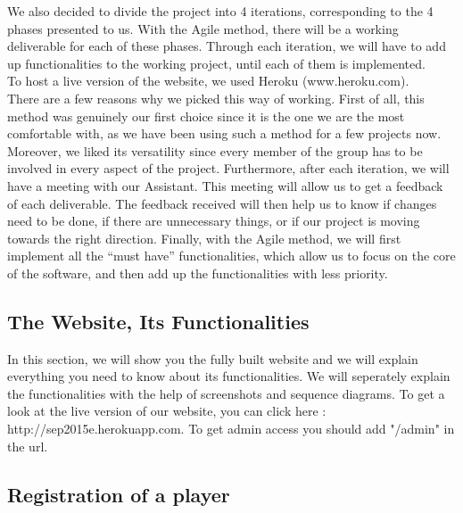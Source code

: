 \documentclass[a4paper, 12pt]{article}
\begin{document}
We also decided to divide the project into 4 iterations, corresponding to the 4 phases presented to us. With the Agile method, there will be a working deliverable for each of these phases. Through each iteration, we will have to add up functionalities to the working project, until each of them is implemented.  \\

To host a live version of the website, we used Heroku (www.heroku.com).\\

There are a few reasons why we picked this way of working. First of all, this method was genuinely our first choice since it is the one we are the most comfortable with, as we have been using such a method for a few projects now. Moreover, we liked its versatility since every member of the group has to be involved in every aspect of the project. Furthermore, after each iteration, we will have a meeting with our Assistant. This meeting will allow us to get a feedback of each deliverable. The feedback received will then help us to know if changes need to be done, if there are unnecessary things, or if our project is moving towards the right direction. Finally, with the Agile method, we will first implement all the “must have” functionalities, which allow us to focus on the core of the software, and then add up the functionalities with less priority. \\
\subsection{The Website, Its Functionalities}

In this section, we will show you the fully built website and we will explain everything you need to know about its functionalities. We will seperately explain the functionalities with the help of screenshots and sequence diagrams. To get a look at the live version of our website, you can click here : http://sep2015e.herokuapp.com. To get admin access you should add "/admin" in the url.\\



\subsection*{Registration of a player}

\end{document}

